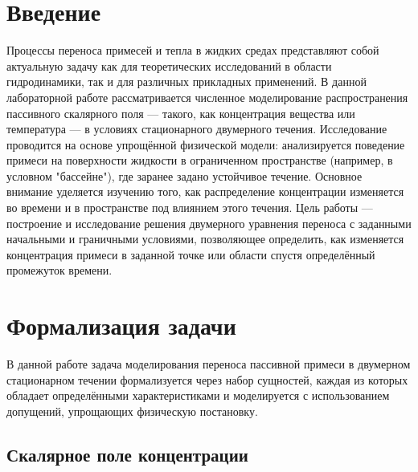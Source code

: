\documentclass[a4paper,12pt]{article}
\begin{document}
\tableofcontents

\newpage

\section{Введение}
Процессы переноса примесей и тепла в жидких средах представляют собой актуальную задачу как для теоретических исследований в области гидродинамики, так и для различных прикладных применений. В данной лабораторной работе рассматривается численное моделирование распространения пассивного скалярного поля — такого, как концентрация вещества или температура — в условиях стационарного двумерного течения.
Исследование проводится на основе упрощённой физической модели: анализируется поведение примеси на поверхности жидкости в ограниченном пространстве (например, в условном "бассейне"), где заранее задано устойчивое течение. Основное внимание уделяется изучению того, как распределение концентрации изменяется во времени и в пространстве под влиянием этого течения.
Цель работы — построение и исследование решения двумерного уравнения переноса с заданными начальными и граничными условиями, позволяющее определить, как изменяется концентрация примеси в заданной точке или области спустя определённый промежуток времени.

\newpage

\section{Формализация задачи}

В данной работе задача моделирования переноса пассивной примеси в двумерном стационарном течении формализуется через набор сущностей, каждая из которых обладает определёнными характеристиками и моделируется с использованием допущений, упрощающих физическую постановку.

\subsection{Скалярное поле концентрации}
\end{document}

